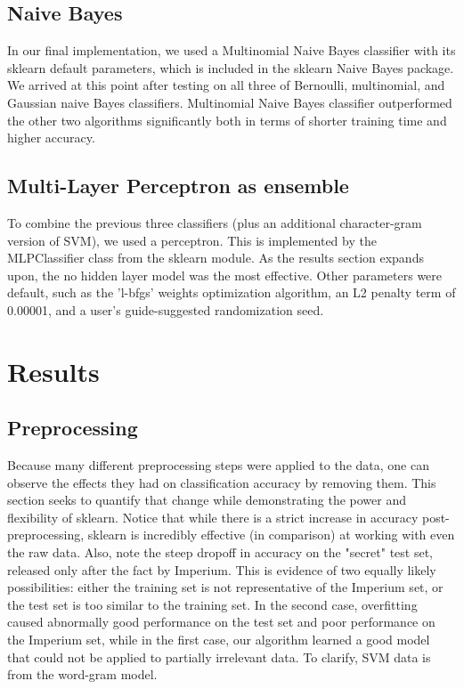 \documentclass[11pt]{article}
\begin{document}
\subsection{Naive Bayes}

In our final implementation, we used a Multinomial Naive Bayes classifier with
its sklearn default parameters, which is included in the sklearn Naive Bayes
package. We arrived at this point after testing on all three of Bernoulli,
multinomial, and Gaussian naive Bayes classifiers. Multinomial Naive Bayes
classifier outperformed the other two algorithms significantly both in terms of
shorter training time and higher accuracy.

\subsection{Multi-Layer Perceptron as ensemble}

To combine the previous three classifiers (plus an additional character-gram
version of SVM), we used a perceptron. This is implemented by the MLPClassifier
class from the sklearn module. As the results section expands upon, the no
hidden layer model was the most effective. Other parameters were default, such
as the 'l-bfgs' weights optimization algorithm, an L2 penalty term of 0.00001,
and a user's guide-suggested randomization seed.

\section{Results}

\subsection{Preprocessing}

Because many different preprocessing steps were applied to the data, one can
observe the effects they had on classification accuracy by removing them. This
section seeks to quantify that change while demonstrating the power and
flexibility of sklearn.  Notice that while there is a strict increase in
accuracy post-preprocessing, sklearn is incredibly effective (in comparison) at
working with even the raw data.  Also, note the steep dropoff in accuracy on
the "secret" test set, released only after the fact by Imperium. This is
evidence of two equally likely possibilities: either the training set is not
representative of the Imperium set, or the test set is too similar to the
training set. In the second case, overfitting caused abnormally good
performance on the test set and poor performance on the Imperium set, while in
the first case, our algorithm learned a good model that could not be applied to
partially irrelevant data. To clarify, SVM data is from the word-gram model.
\end{document}
